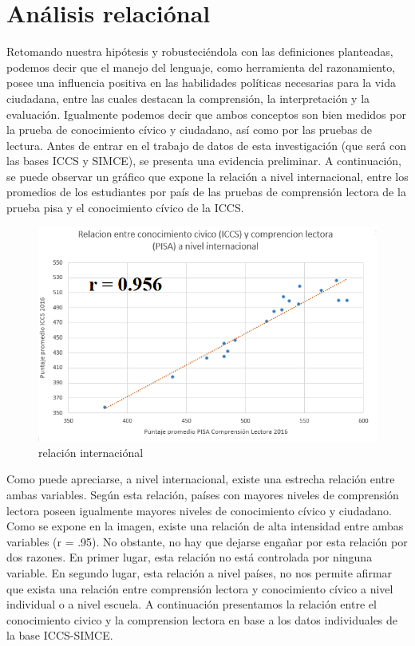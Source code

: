 \documentclass[12pt,twoside]{templates/facsothesis}
\begin{document}
\newpage

\hypertarget{anuxe1lisis-relaciuxf3nal}{%
\section{Análisis relaciónal}\label{anuxe1lisis-relaciuxf3nal}}

Retomando nuestra hipótesis y robusteciéndola con las definiciones planteadas, podemos decir que el manejo del lenguaje, como herramienta del razonamiento, posee una influencia positiva en las habilidades políticas necesarias para la vida ciudadana, entre las cuales destacan la comprensión, la interpretación y la evaluación. Igualmente podemos decir que ambos conceptos son bien medidos por la prueba de conocimiento cívico y ciudadano, así como por las pruebas de lectura. Antes de entrar en el trabajo de datos de esta investigación (que será con las bases ICCS y SIMCE), se presenta una evidencia preliminar. A continuación, se puede observar un gráfico que expone la relación a nivel internacional, entre los promedios de los estudiantes por país de las pruebas de comprensión lectora de la prueba pisa y el conocimiento cívico de la ICCS.

\begin{figure}[!ht]

{\centering \includegraphics[width=1\linewidth,]{images/relacionmacro} 

}

\caption{relación internaciónal}\label{fig:unnamed-chunk-9}
\end{figure}

Como puede apreciarse, a nivel internacional, existe una estrecha relación entre ambas variables. Según esta relación, países con mayores niveles de comprensión lectora poseen igualmente mayores niveles de conocimiento cívico y ciudadano. Como se expone en la imagen, existe una relación de alta intensidad entre ambas variables (r = .95). No obstante, no hay que dejarse engañar por esta relación por dos razones. En primer lugar, esta relación no está controlada por ninguna variable. En segundo lugar, esta relación a nivel países, no nos permite afirmar que exista una relación entre comprensión lectora y conocimiento cívico a nivel individual o a nivel escuela. A continuación presentamos la relación entre el conocimiento civico y la comprension lectora en base a los datos individuales de la base ICCS-SIMCE.
\end{document}
